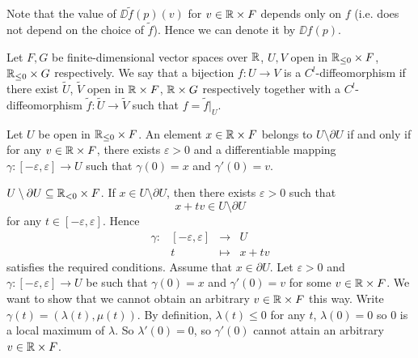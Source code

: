 \begin{remark}
    Note that the value of $\DD \tilde{f}(p)(v)$ for $v \in \mathbb{R} \times F$ depends only on $f$ (i.e. does not depend on the choice of $\tilde{f}$).
    Hence we can denote it by $\DD f (p)$.
\end{remark}

\begin{definitionenv}
    Let $F,G$ be finite-dimensional vector spaces over $\mathbb{R}$,
    $U,V$ open in $\mathbb{R}_{\le 0} \times F$, $\mathbb{R}_{\le 0} \times G$ respectively.
    We say that a bijection $f : U \longrightarrow V$ is a $C^l$-diffeomorphism if there exist $\tilde{U}$, $\tilde{V}$ open in $\mathbb{R} \times F$, $\mathbb{R} \times G$ respectively together with a $C^l$-diffeomorphism $\tilde{f} : \tilde{U} \longrightarrow \tilde{V}$ such that $f = \tilde{f} |_{U}$.
\end{definitionenv}

\begin{propositionenv}
    Let $U$ be open in $\mathbb{R}_{\le 0} \times F$.
    An element $x \in \mathbb{R} \times F$ belongs to $U \setminus \partial U$ if and only if for any $v \in \mathbb{R} \times F$, there exists $\varepsilon > 0$ and a differentiable mapping $\gamma : [-\varepsilon, \varepsilon] \longrightarrow U$ such that $\gamma(0) = x$ and $\gamma'(0) = v$.
\end{propositionenv}
\begin{proofenv}
    $U \setminus \partial U \subseteq \mathbb{R}_{< 0} \times F$.
    If $x \in U \setminus \partial U$, then there exists $\varepsilon > 0$ such that
    $$x + t v \in U \setminus \partial U$$
    for any $t \in [-\varepsilon, \varepsilon]$.
    Hence
    $$\begin{array}{rrcl}
        \gamma : & [-\varepsilon, \varepsilon] & \longrightarrow & U\\
        & t & \longmapsto & x + t v
    \end{array}$$
    satisfies the required conditions.
    Assume that $x \in \partial U$.
    Let $\varepsilon > 0$ and $\gamma: [-\varepsilon ,\varepsilon] \longrightarrow U$ be such that $\gamma(0) = x$ and $\gamma'(0) = v$ for some $v \in \mathbb{R} \times F$.
    We want to show that we cannot obtain an arbitrary $v \in \mathbb{R} \times F$ this way.
    Write $\gamma(t) = (\lambda(t), \mu(t))$.
    By definition, $\lambda(t) \le 0$ for any $t$, $\lambda(0) = 0$ so $0$ is a local maximum of $\lambda$.
    So $\lambda'(0) = 0$, so $\gamma'(0)$ cannot attain an arbitrary $v \in \mathbb{R} \times F$.
\end{proofenv}

